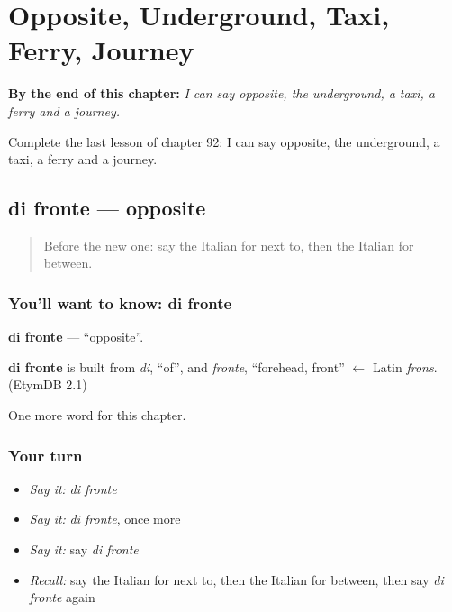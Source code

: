 
\chapter{Opposite, Underground, Taxi, Ferry, Journey}
\label{ch:it-opposite-underground-taxi-ferry-journey}

\begin{chapteropening}
\textbf{By the end of this chapter:} \emph{I can say opposite, the underground, a taxi, a ferry and a journey.}

Complete the last lesson of chapter 92: I can say opposite, the underground, a taxi, a ferry and a journey.
\end{chapteropening}

\section[di fronte]{di fronte — opposite}

\label{lesson:IT-C92-di-fronte}



\begin{quote}
Before the new one: say the Italian for next to, then the Italian for between.
\end{quote}

\subsection*{You'll want to know: di fronte}
\textbf{di fronte} — \textquotedblleft{}opposite\textquotedblright{}.

\begin{cousinweb}
\textbf{di fronte} is built from \emph{di}, \textquotedblleft{}of\textquotedblright{}, and \emph{fronte}, \textquotedblleft{}forehead, front\textquotedblright{} $\leftarrow$ Latin \emph{frons}. (EtymDB 2.1)
\end{cousinweb}

\begin{grammarlens}[title={What you've built}]
One more word for this chapter.
\end{grammarlens}

\subsection*{Your turn}
\begin{itemize}
\raggedright
  \item \emph{Say it:} \emph{di fronte}
  \item \emph{Say it:} \emph{di fronte}, once more
  \item \emph{Say it:} say \emph{di fronte}
  \item \emph{Recall:} say the Italian for next to, then the Italian for between, then say \emph{di fronte} again
\end{itemize}


